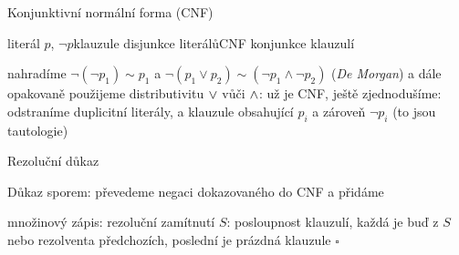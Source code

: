 \documentclass{beamer}
\begin{document}
\begin{frame}{Konjunktivní normální forma (CNF)}

    \alert{literál} $p$, $\neg p$\hfill \alert{klauzule} disjunkce literálů\hfill \alert{CNF} konjunkce klauzulí

    \vspace{-6pt}
    nahradíme \alert{$\neg (\neg p_1) \sim p_1$} a \alert{$\neg (p_1 \lor p_2) \sim (\neg p_1 \land \neg p_2)$} (\emph{De Morgan})
    \vspace{-6pt}
    a dále opakovaně použijeme \alert{distributivitu} \( {\lor} \) vůči \( {\land} \):
    \vspace{-6pt}
    už je CNF, ještě zjednodušíme: odstraníme duplicitní literály, a klauzule obsahující $p_i$ a zároveň $\neg p_i$ (to jsou \alert{tautologie})
\end{frame}


\begin{frame}{Rezoluční důkaz}

Důkaz sporem: převedeme \alert{negaci} dokazovaného do CNF a přidáme

\vspace{-6pt}
množinový zápis:
\vspace{-6pt}
\alert{rezoluční zamítnutí $S$}: posloupnost klauzulí, každá je buď z $S$ nebo rezolventa předchozích, poslední je prázdná klauzule $\square$

\end{frame}
\end{document}
